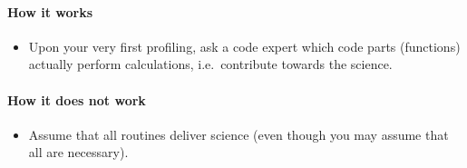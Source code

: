 \paragraph*{How it works}

\begin{itemize}[noitemsep]
  \item[$\boxplus$] Upon your very first profiling, ask a code expert which code parts (functions) actually perform calculations, i.e.~contribute towards the science.
\end{itemize}


\paragraph*{How it does not work}

\begin{itemize}[noitemsep]
  \item[$\boxminus$] Assume that all routines deliver science (even though you may assume that all are necessary).
\end{itemize}
